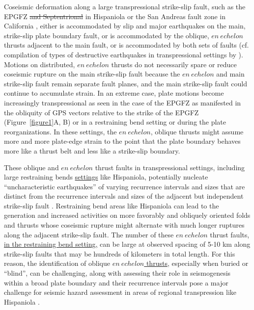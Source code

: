 \documentclass[linenumbers,draft]{agujournal}
\begin{document}
Coseismic deformation along a large transpressional strike-slip fault, such as the EPGFZ \st{and Septentrional} \citep{calais2002strain} in Hispaniola or the San Andreas fault zone in California \citep{segall1990surface}, either is accommodated by slip and major earthquakes on the main, strike-slip plate boundary fault, or is accommodated by the oblique, $en~echelon$ thrusts adjacent to the main fault, or is accommodated by both sets of faults (cf. compilation of types of destructive earthquakes in transpressional settings by \citet{hayes2010complex}). Motions on distributed, $en~echelon$ thrusts do not necessarily spare or reduce coseismic rupture on the main strike-slip fault because the $en~echelon$ and main strike-slip fault remain separate fault planes, and the main strike-slip fault could continue to accumulate strain. In an extreme case, plate motions become increasingly transpressional as seen in the case of the EPGFZ as manifested in the obliquity of GPS vectors relative to the strike of the EPGFZ (Figure~\ref{figure1}A, B) or in a restraining bend setting or during the plate reorganizations. In these settings, the $en~echelon$, oblique thrusts might assume more and more plate-edge strain to the point that the plate boundary behaves more like a thrust belt and less like a strike-slip boundary.

These oblique and $en~echelon$ thrust faults in transpressional settings, including large restraining bends \ul{settings} like Hispaniola, potentially nucleate ``uncharacteristic earthquakes'' of varying recurrence intervals and sizes that are distinct from the recurrence intervals and sizes of the adjacent but independent strike-slip fault \citep{Fielding2013}. Restraining bend areas like Hispaniola can lead to the generation and increased activities on more favorably and obliquely oriented folds and thrusts whose coseismic rupture might alternate with much longer ruptures along the adjacent strike-slip fault. The number of these $en~echelon$ thrust faults, \ul{in the restraining bend setting,} can be large at observed spacing of 5-10 km along strike-slip faults that may be hundreds of kilometers in total length. For this reason, the identification of oblique \ul{$en~echelon$ thrusts}, especially when buried or ``blind'', can be challenging, along with assessing their role in seismogenesis within a broad plate boundary and their recurrence intervals pose a major challenge for seismic hazard assessment in areas of regional transpression like Hispaniola \citep{frankel2011seismic}.
\end{document}

